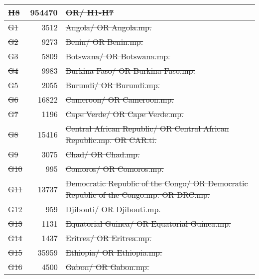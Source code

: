 \begin{longtable}{lrl}
   \st{H8} & \num{954470} & \st{OR/ H1-H7}                                                                       \\
  \midrule
   \st{G1} &   \num{3512} & \st{Angola/ OR Angola.mp.}                                                                \\
   \st{G2} &   \num{9273} & \st{Benin/ OR Benin.mp.}                                                                  \\
   \st{G3} &   \num{5809} & \st{Botswana/ OR Botswana.mp.}                                                            \\
   \st{G4} &   \num{9983} & \st{Burkina Faso/ OR Burkina Faso.mp.}                                                    \\
   \st{G5} &   \num{2055} & \st{Burundi/ OR Burundi.mp.}                                                              \\
   \st{G6} &  \num{16822} & \st{Cameroon/ OR Cameroon.mp.}                                                            \\
   \st{G7} &   \num{1196} & \st{Cape Verde/ OR Cape Verde.mp.}                                                        \\
   \st{G8} &  \num{15416} & \st{Central African Republic/ OR Central African Republic.mp. OR CAR.ti.}                 \\
   \st{G9} &   \num{3075} & \st{Chad/ OR Chad.mp.}                                                                    \\
  \st{G10} &    \num{995} & \st{Comoros/ OR Comoros.mp.}                                                              \\
  \st{G11} &  \num{13737} & \st{Democratic Republic of the Congo/ OR Democratic Republic of the Congo.mp. OR DRC.mp.} \\
  \st{G12} &    \num{959} & \st{Djibouti/ OR Djibouti.mp.}                                                            \\
  \st{G13} &   \num{1131} & \st{Equatorial Guinea/ OR Equatorial Guinea.mp.}                                          \\
  \st{G14} &   \num{1437} & \st{Eritrea/ OR Eritrea.mp.}                                                              \\
  \st{G15} &  \num{35959} & \st{Ethiopia/ OR Ethiopia.mp.}                                                            \\
  \st{G16} &   \num{4500} & \st{Gabon/ OR Gabon.mp.}                                                                  \\

\end{longtable}
